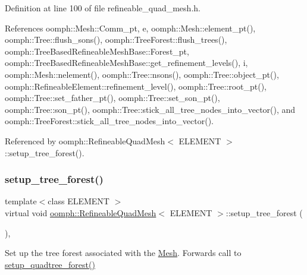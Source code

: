 Definition at line 100 of file refineable\+\_\+quad\+\_\+mesh.\+h.



References oomph\+::\+Mesh\+::\+Comm\+\_\+pt, e, oomph\+::\+Mesh\+::element\+\_\+pt(), oomph\+::\+Tree\+::flush\+\_\+sons(), oomph\+::\+Tree\+Forest\+::flush\+\_\+trees(), oomph\+::\+Tree\+Based\+Refineable\+Mesh\+Base\+::\+Forest\+\_\+pt, oomph\+::\+Tree\+Based\+Refineable\+Mesh\+Base\+::get\+\_\+refinement\+\_\+levels(), i, oomph\+::\+Mesh\+::nelement(), oomph\+::\+Tree\+::nsons(), oomph\+::\+Tree\+::object\+\_\+pt(), oomph\+::\+Refineable\+Element\+::refinement\+\_\+level(), oomph\+::\+Tree\+::root\+\_\+pt(), oomph\+::\+Tree\+::set\+\_\+father\+\_\+pt(), oomph\+::\+Tree\+::set\+\_\+son\+\_\+pt(), oomph\+::\+Tree\+::son\+\_\+pt(), oomph\+::\+Tree\+::stick\+\_\+all\+\_\+tree\+\_\+nodes\+\_\+into\+\_\+vector(), and oomph\+::\+Tree\+Forest\+::stick\+\_\+all\+\_\+tree\+\_\+nodes\+\_\+into\+\_\+vector().



Referenced by oomph\+::\+Refineable\+Quad\+Mesh$<$ E\+L\+E\+M\+E\+N\+T $>$\+::setup\+\_\+tree\+\_\+forest().

\mbox{\label{classoomph_1_1RefineableQuadMesh_ae3fed75707aa829323aeaf25ac343247}} 
\subsubsection{\texorpdfstring{setup\+\_\+tree\+\_\+forest()}{setup\_tree\_forest()}}
{\footnotesize\ttfamily template$<$class E\+L\+E\+M\+E\+NT $>$ \\
virtual void \hyperlink{classoomph_1_1RefineableQuadMesh}{oomph\+::\+Refineable\+Quad\+Mesh}$<$ E\+L\+E\+M\+E\+NT $>$\+::setup\+\_\+tree\+\_\+forest (\begin{DoxyParamCaption}{ }\end{DoxyParamCaption})\hspace{0.3cm}{\ttfamily [inline]}, {\ttfamily [virtual]}}



Set up the tree forest associated with the \hyperlink{classoomph_1_1Mesh}{Mesh}. Forwards call to \hyperlink{classoomph_1_1RefineableQuadMesh_ab27780da6f9be1b625d75fc4973ce8f1}{setup\+\_\+quadtree\+\_\+forest()} 



